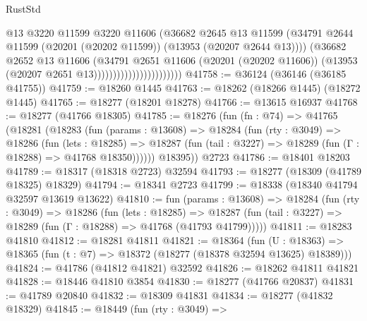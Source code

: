 \begin{lexlean}{RustStd}
\begin{coremodule}
                                          @13
                                          @3220
                                          @11599
                                          @3220
                                          @11606
                                          (@36682
                                            @2645
                                            @13
                                            @11599
                                            (@34791
                                              @2644
                                              @11599
                                              (@20201 (@20202 @11599))
                                              (@13953 (@20207 @2644 @13))))
                                          (@36682
                                            @2652
                                            @13
                                            @11606
                                            (@34791
                                              @2651
                                              @11606
                                              (@20201 (@20202 @11606))
                                              (@13953 (@20207 @2651 @13)))))))))))))))))))))))
@41758 := @36124 (@36146 (@36185 @41755))
@41759 := @18260 @1445
@41763 := @18262 (@18266 @1445) (@18272 @1445)
@41765 := @18277 (@18201 @18278)
@41766 := @13615 @16937
@41768 := @18277 (@41766 @18305)
@41785 := @18276
    (fun (fn : @74) =>
    @41765
      (@18281
        (@18283
          (fun (params : @13608) =>
          @18284
            (fun (rty : @3049) =>
            @18286
              (fun (lets : @18285) =>
              @18287 (fun (tail : @3227) => @18289 (fun (Γ : @18288) => @41768 @18350))))))
        @18395))
    @2723
@41786 := @18401 @18203
@41789 := @18317 (@18318 @2723) @32594
@41793 := @18277 (@18309 (@41789 @18325) @18329)
@41794 := @18341 @2723
@41799 := @18338 (@18340 @41794 @32597 @13619 @13622)
@41810 := fun (params : @13608) =>
  @18284
    (fun (rty : @3049) =>
    @18286
      (fun (lets : @18285) =>
      @18287 (fun (tail : @3227) => @18289 (fun (Γ : @18288) => @41768 (@41793 @41799)))))
@41811 := @18283 @41810
@41812 := @18281 @41811
@41821 := @18364
    (fun (U : @18363) => @18365 (fun (t : @7) => @18372 (@18277 (@18378 @32594 @13625) @18389)))
@41824 := @41786 (@41812 @41821) @32592
@41826 := @18262 @41811 @41821
@41828 := @18446 @41810 @3854
@41830 := @18277 (@41766 @20837)
@41831 := @41789 @20840
@41832 := @18309 @41831
@41834 := @18277 (@41832 @18329)
@41845 := @18449
    (fun (rty : @3049) =>

\end{coremodule}
\end{lexlean}
